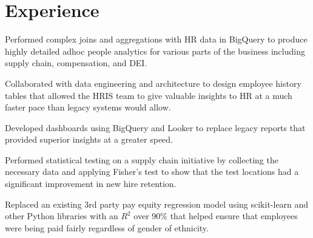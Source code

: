 \documentclass[]{plushcv}
\begin{document}
%
%



%
%

\begin{minipage}[t]{0.70\textwidth} 



\section{Experience}
\vspace{\topsep} %
\begin{tightemize}
\sectionsep
\item Performed complex joins and aggregations with HR data in BigQuery to produce highly detailed adhoc people analytics for various parts of the business including supply chain, compensation, and DEI.
\item Collaborated with data engineering and architecture to design employee history tables that allowed the HRIS team to give valuable insights to HR at a much faster pace than legacy systems would allow.
\item Developed dashboards using BigQuery and Looker to replace legacy reports that provided superior insights at a greater speed.
\item Performed statistical testing on a supply chain initiative by collecting the necessary data and applying Fisher's test to show that the test locations had a significant improvement in new hire retention.
\item Replaced an existing 3rd party pay equity regression model using scikit-learn and other Python libraries with an $R^2$ over 90\% that helped ensure that employees were being paid fairly regardless of gender of ethnicity.
\end{tightemize}
\sectionsep


\end{minipage}
\end{document}
